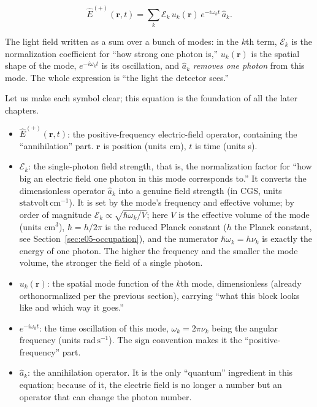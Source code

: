 \begin{equation}
  \hat E^{(+)}(\bm r,t)=\sum_k \mathcal E_k\,u_k(\bm r)\,e^{-i\omega_k t}\,\hat a_k .
  \label{eq:e05-field-expansion}
\end{equation}
\begin{formulaexplain}
The light field written as a sum over a bunch of modes: in the \(k\)th term, \(\mathcal E_k\) is the normalization coefficient for ``how strong one photon is,'' \(u_k(\bm r)\) is the spatial shape of the mode, \(e^{-i\omega_k t}\) is its oscillation, and \(\hat a_k\) \emph{removes one photon} from this mode. The whole expression is ``the light the detector sees.''
\end{formulaexplain}

Let us make each symbol clear; this equation is the foundation of all the later chapters.

\begin{itemize}
  \item \(\hat E^{(+)}(\bm r,t)\): the positive-frequency electric-field operator, containing the ``annihilation'' part. \(\bm r\) is position (units cm), \(t\) is time (units s).
  \item \(\mathcal E_k\): the single-photon field strength, that is, the normalization factor for ``how big an electric field one photon in this mode corresponds to.'' It converts the dimensionless operator \(\hat a_k\) into a genuine field strength (in CGS, units \(\mathrm{statvolt\,cm^{-1}}\)). It is set by the mode's frequency and effective volume; by order of magnitude \(\mathcal E_k\propto\sqrt{\hbar\omega_k/V}\); here \(V\) is the effective volume of the mode (units cm\(^3\)), \(\hbar=h/2\pi\) is the reduced Planck constant (\(h\) the Planck constant, see Section~\ref{sec:e05-occupation}), and the numerator \(\hbar\omega_k=h\nu_k\) is exactly the energy of one photon. The higher the frequency and the smaller the mode volume, the stronger the field of a single photon.
  \item \(u_k(\bm r)\): the spatial mode function of the \(k\)th mode, dimensionless (already orthonormalized per the previous section), carrying ``what this block looks like and which way it goes.''
  \item \(e^{-i\omega_k t}\): the time oscillation of this mode, \(\omega_k=2\pi\nu_k\) being the angular frequency (units \(\mathrm{rad\,s^{-1}}\)). The sign convention makes it the ``positive-frequency'' part.
  \item \(\hat a_k\): the annihilation operator. It is the only ``quantum'' ingredient in this equation; because of it, the electric field is no longer a number but an operator that can change the photon number.
\end{itemize}

